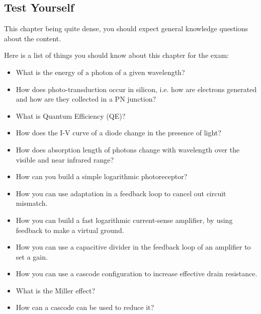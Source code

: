 \subsection{Test Yourself}

This chapter being quite dense, you should expect general knowledge questions about the content. 

Here is a list of things you should know about this chapter for the exam: 

\begin{itemize}
    \item What is the energy of a photon of a given wavelength?
    \item How does photo-transduction occur in silicon, i.e. how are electrons generated and how are they collected in a PN junction?
    \item What is Quantum Efficiency (QE)?
    \item How does the I-V curve of a diode change in the presence of light?
    \item How does absorption length of photons change with wavelength over the visible and near infrared range?
    \item How can you build a simple logarithmic photoreceptor?
    \item How you can use adaptation in a feedback loop to cancel out circuit mismatch.
    \item How you can build a fast logarithmic current-sense amplifier, by using feedback to make a virtual ground.
    \item How you can use a capacitive divider in the feedback loop of an amplifier to set a gain.
    \item How you can use a cascode configuration to increase effective drain resistance.
    \item What is the Miller effect?
    \item How can a cascode can be used to reduce it?
\end{itemize}